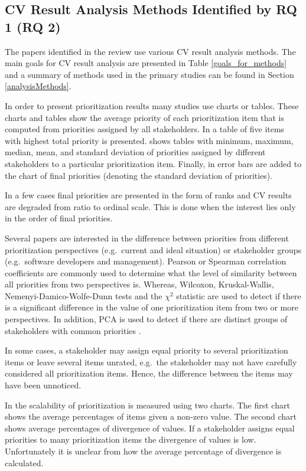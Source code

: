 \subsection{\label{rq2}CV Result Analysis Methods Identified by RQ 1 (RQ 2)}
The papers identified in the review use various CV result analysis
methods. 
The main goals for CV result analysis are presented in Table \ref{goals_for_methods} and a summary of methods used in the primary studies can be found in Section \ref{analysisMethods}.

In order to present prioritization results many studies use charts or
tables. These charts and tables show the average priority of each prioritization item that is computed from priorities assigned by all stakeholders.
In \citep{Jonsson2005a} a table of five items with highest total priority is presented. 
\citep{Kuzniarz2010} shows tables with minimum, maximum, median, mean, and standard deviation of priorities assigned by different stakeholders to a particular prioritization item. Finally, in \citep{Rovegard2008,Kuzniarz2010} error bars are added to the chart of final priorities (denoting the standard deviation of priorities).

In a few cases final priorities are presented in the form of ranks and CV results are degraded from ratio to ordinal scale. This is done when the interest lies only in the order of final priorities.

Several papers are interested in the difference between priorities from
different prioritization perspectives (e.g.\ current and ideal situation)
or stakeholder groups (e.g.\ software developers and management). Pearson
or Spearman correlation coefficients are commonly used to determine what 
the level of similarity between all priorities from two perspectives is.
Whereas, Wilcoxon, Kruskal-Wallis, Nemenyi-Damico-Wolfe-Dunn tests and the $\chi^2$ statistic are used to detect if there is a significant
difference in the value of one prioritization item from two or more perspectives. In addition, PCA is used to detect if there are distinct groups of stakeholders with common priorities \citep{Chatzipetrou2010,Pettersson2008,Wohlin2006}.

In some cases, a stakeholder may assign equal priority to several prioritization items or leave several items unrated, e.g.\ the stakeholder may not have carefully considered all prioritization items. Hence, the difference between the items may have been unnoticed.

In \citep{Berander2006a} the scalability of prioritization is measured
using two charts. The first chart shows the average percentages of items given a non-zero value. The second chart shows average percentages of divergence of values. If a stakeholder assigns equal priorities to many prioritization items the divergence of values is low. Unfortunately it is unclear from \citep{Berander2006a} how the average percentage of divergence is calculated.

